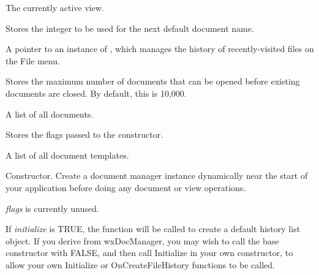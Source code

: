 

The currently active view.



Stores the integer to be used for the next default document name.



A pointer to an instance of ,
which manages the history of recently-visited files on the File menu.



Stores the maximum number of documents that can be opened before
existing documents are closed. By default, this is 10,000.



A list of all documents.



Stores the flags passed to the constructor.



A list of all document templates.



Constructor. Create a document manager instance dynamically near the start of your application
before doing any document or view operations.

{\it flags} is currently unused.

If {\it initialize} is TRUE, the  function will be called
to create a default history list object. If you derive from wxDocManager, you may wish to call the
base constructor with FALSE, and then call Initialize in your own constructor, to allow
your own Initialize or OnCreateFileHistory functions to be called.


